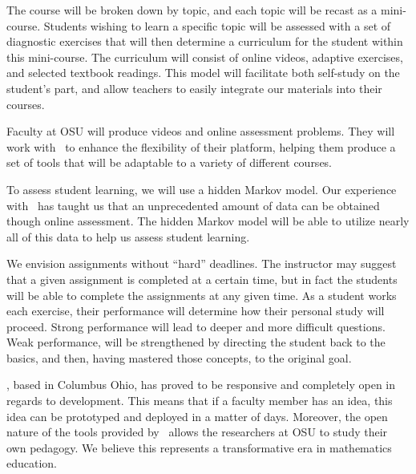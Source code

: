 
The course will be broken down by topic, and each topic will be recast
as a mini-course. Students wishing to learn a specific topic will be
assessed with a set of diagnostic exercises that will then determine a
curriculum for the student within this mini-course. The curriculum
will consist of online videos, adaptive exercises, and selected
textbook readings. This model will facilitate both self-study on the
student's part, and allow teachers to easily integrate our materials
into their courses.


Faculty at OSU will produce videos and online assessment
problems. They will work with \gratisu\ to enhance the flexibility of
their platform, helping them produce a set of tools that will be
adaptable to a variety of different courses.



To assess student learning, we will use a hidden Markov model. Our
experience with \mooculus\ has taught us that an unprecedented
amount of data can be obtained though online assessment. The hidden
Markov model will be able to utilize nearly all of this data to help
us assess student learning.



We envision assignments without ``hard'' deadlines. The instructor
may suggest that a given assignment is completed at a certain time,
but in fact the students will be able to complete the assignments at
any given time. As a student works each exercise, their performance
will determine how their personal study will proceed. Strong
performance will lead to deeper and more difficult questions. Weak
performance, will be strengthened by directing the student back to the
basics, and then, having mastered those concepts, to the original
goal.



\gratisu, based in Columbus Ohio, has proved to be responsive and
completely open in regards to development. This means that if a
faculty member has an idea, this idea can be prototyped and deployed
in a matter of days. Moreover, the open nature of the tools provided
by \gratisu\ allows the researchers at OSU to study their own
pedagogy. We believe this represents a transformative era in
mathematics education.


